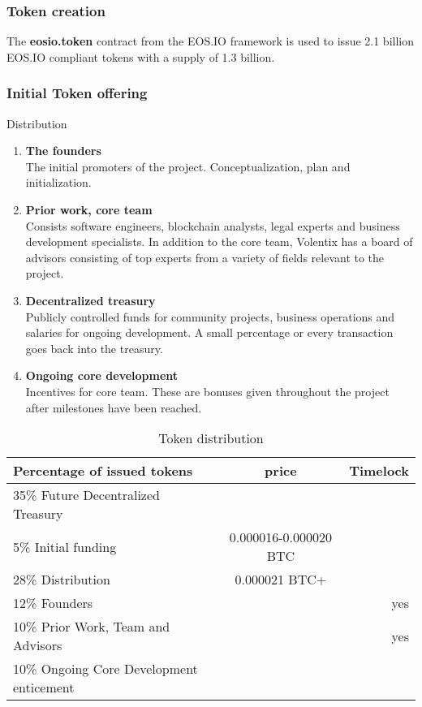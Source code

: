 \documentclass[]{article}
\begin{document}
\subsubsection{Token creation}
The \textbf{eosio.token} contract from the EOS.IO framework is used to issue 2.1 billion EOS.IO compliant tokens 
with a supply of 1.3 billion.
 
 
\subsubsection{Initial Token offering}
 
Distribution
\begin{enumerate}
\item \textbf{The founders}\\
The initial promoters of the project. 
Conceptualization, plan and initialization.	
\item \textbf{Prior work,	 core team }\\
Consists software engineers, blockchain analysts, legal experts and business development specialists. 
In addition to the core team, Volentix has a board of advisors consisting of top experts from a variety of fields relevant to the project.
\item\textbf{ Decentralized treasury}\\
Publicly controlled funds for community projects, business operations and salaries for ongoing development. 
A small percentage or every transaction goes back into the treasury.
\item \textbf{Ongoing core development} \\
Incentives for core team. These are bonuses given throughout the project after milestones have been reached.
\end{enumerate}
	
\begin{table}[h!]
	\begin{center}
		\caption{Token distribution}
		\label{tab:table1}
		\begin{tabular}{l|c|r}
			\textbf{Percentage of issued tokens} & \textbf{price} & \textbf{Timelock} \\
		
			\hline
			35\% Future Decentralized Treasury & & \\
			\hline
			5\%  Initial funding & 0.000016-0.000020 BTC & \\
			\hline
			28\% Distribution & 0.000021 BTC+ & \\
			\hline
			12\% Founders &  & yes \\
			\hline
			10\% Prior Work, Team and Advisors & & yes\\
		
			\hline
			10\% Ongoing Core Development enticement & &\\
			\hline		
			
				
		\end{tabular}
	\end{center}


\end{table}
\end{document}
